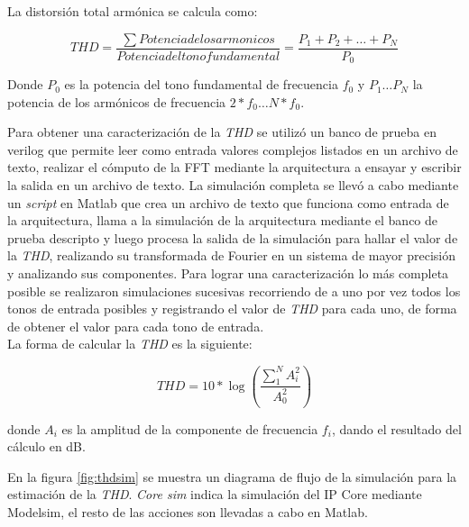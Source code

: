 La distorsión total armónica se calcula como:

\begin{equation}
THD = \frac{\sum Potencia de los armonicos}{Potencia del tono fundamental} =
\frac{P_1+P_2+\ldots +P_N}{P_0}
\label{eq:THD1}
\end{equation}

Donde $P_0$ es la potencia del tono fundamental de frecuencia $f_0$ y $P_1\ldots P_N$ la potencia de
los armónicos de frecuencia $2*f_0\ldots N*f_0$.

Para obtener una caracterización de la \textit{THD} se utilizó un banco de prueba en verilog que permite
leer como entrada valores complejos listados en un archivo de texto, realizar el cómputo de la FFT
mediante la arquitectura a ensayar y escribir la salida en un archivo de texto. 
La simulación completa se llevó a cabo mediante un \textit{script} en Matlab que crea un archivo de texto que
funciona como entrada de la arquitectura, llama a la simulación de la arquitectura mediante el
banco de prueba descripto y luego procesa la salida de la simulación para hallar el valor de la
\textit{THD}, realizando su transformada de Fourier en un sistema de mayor precisión y analizando
sus componentes.
Para lograr una caracterización lo más completa posible se realizaron simulaciones sucesivas recorriendo de a uno por vez todos los tonos de entrada posibles y registrando el valor de
\textit{THD} para cada uno, de forma de obtener el valor para cada tono de entrada.\\
La forma de calcular la \textit{THD} es la siguiente:

\begin{equation}
THD = 10*\log(\frac{\sum_1^N A_i^2}{A_0^2})
\label{eq:THD2}
\end{equation}

donde $A_i$ es la amplitud de la componente de frecuencia $f_i$, dando el resultado del cálculo en
dB.

En la figura \ref{fig:thdsim} se muestra un diagrama de flujo de la simulación para la estimación de
la \textit{THD}. \textit{Core sim} indica la simulación del IP Core mediante Modelsim, el resto de
las acciones son llevadas a cabo en Matlab.

